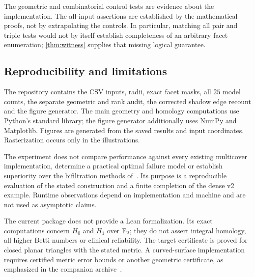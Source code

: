 The geometric and combinatorial control tests are evidence about the implementation. The all-input assertions are established by the mathematical proofs, not by extrapolating the controls. In particular, matching all pair and triple tests would not by itself establish completeness of an arbitrary facet enumeration; \cref{thm:witness} supplies that missing logical guarantee.

\subsection{Reproducibility and limitations}
The repository contains the CSV inputs, radii, exact facet masks, all $25$ model counts, the separate geometric and rank audit, the corrected shadow edge recount and the figure generator. The main geometry and homology computations use Python's standard library; the figure generator additionally uses NumPy and Matplotlib. Figures are generated from the saved results and input coordinates. Rasterization occurs only in the illustrations.

The experiment does not compare performance against every existing multicover implementation, determine a practical optimal failure model or establish superiority over the bifiltration methods of~\cite{corbet,alonso}. Its purpose is a reproducible evaluation of the stated construction and a finite completion of the dense v2 example. Runtime observations depend on implementation and machine and are not used as asymptotic claims.

The current package does not provide a Lean formalization. Its exact computations concern $H_0$ and $H_1$ over $\mathbb F_2$; they do not assert integral homology, all higher Betti numbers or clinical reliability. The target certificate is proved for closed planar triangles with the stated metric. A curved-surface implementation requires certified metric error bounds or another geometric certificate, as emphasized in the companion archive~\cite{ecog}.
\FloatBarrier

